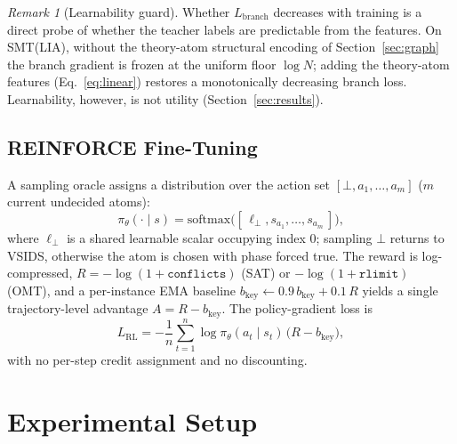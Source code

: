 \documentclass[letterpaper]{article} %
\theoremstyle{definition}
\theoremstyle{plain}
\theoremstyle{remark}
\newtheorem{remark}{Remark}
\newcommand{\defer}{\bot}
\newcommand{\policy}{\pi_\theta}
\newcommand{\confl}{\texttt{conflicts}}
\newcommand{\rlimit}{\texttt{rlimit}}
\begin{document}
\begin{remark}[Learnability guard]
Whether $L_{\mathrm{branch}}$ decreases with training is a direct probe of
whether the teacher labels are predictable from the features. On SMT(LIA),
without the theory-atom structural encoding of Section~\ref{sec:graph} the
branch gradient is frozen at the uniform floor $\log N$; adding the
theory-atom features (Eq.~\ref{eq:linear}) restores a monotonically
decreasing branch loss. Learnability, however, is not utility
(Section~\ref{sec:results}).
\end{remark}

\subsection{REINFORCE Fine-Tuning}
\label{sec:rl}

A sampling oracle assigns a distribution over the action set
$[\defer, a_1,\dots,a_m]$ ($m$ current undecided atoms):
\begin{equation}
\policy(\cdot\mid s)=\mathrm{softmax}\bigl([\,\ell_{\defer},s_{a_1},\dots,s_{a_m}\,]\bigr),
\label{eq:rlpolicy}
\end{equation}
where $\ell_{\defer}$ is a shared learnable scalar occupying index $0$;
sampling $\defer$ returns to VSIDS, otherwise the atom is chosen with phase
forced true. The reward is log-compressed, $R=-\log(1+\confl)$ (SAT) or
$-\log(1+\rlimit)$ (OMT), and a per-instance EMA baseline
$b_{\mathrm{key}}\leftarrow0.9\,b_{\mathrm{key}}+0.1\,R$ yields a single
trajectory-level advantage $A=R-b_{\mathrm{key}}$. The policy-gradient loss
\citep{williams1992reinforce} is
\begin{equation}
L_{\mathrm{RL}}=-\frac{1}{n}\sum_{t=1}^{n}\log\policy(a_t\mid s_t)\,\bigl(R-b_{\mathrm{key}}\bigr),
\label{eq:reinforce}
\end{equation}
with no per-step credit assignment and no discounting.

\section{Experimental Setup}
\label{sec:setup}
\end{document}
